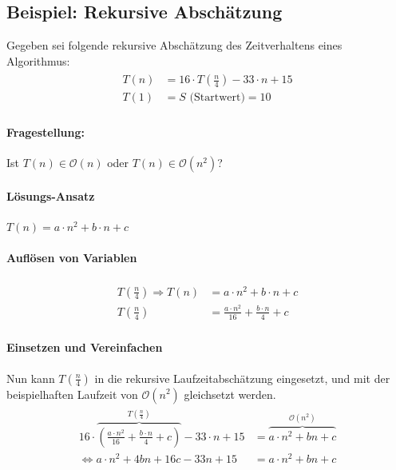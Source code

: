 \subsection{Beispiel: Rekursive Abschätzung}
Gegeben sei folgende rekursive Abschätzung des Zeitverhaltens eines Algorithmus:
\begin{align*}
\begin{split}
	T(n) &= 16 \cdot T(\frac{n}{4}) - 33 \cdot n + 15 \\
	T(1) &= S \text{ (Startwert)} = 10
\end{split}
\end{align*}
\paragraph{Fragestellung:} Ist $T(n) \in \mathcal{O}(n)$ oder $T(n) \in \mathcal{O}(n^2)$?

\paragraph{Lösungs-Ansatz} $T(n) = a\cdot n^2 + b\cdot n + c$

\paragraph{Auflösen von Variablen}
\begin{align}
\begin{split}
T(\frac{n}{4}) \Rightarrow T(n) &= a\cdot n^2 + b\cdot n + c \\
T(\frac{n}{4}) &= \frac{a\cdot n^2}{16} + \frac{b\cdot n}{4} + c
\end{split}
\end{align}

\paragraph{Einsetzen und Vereinfachen}
Nun kann $T(\frac{n}{4})$ in die rekursive Laufzeitabschätzung eingesetzt, und mit der beispielhaften Laufzeit von $\mathcal{O}(n^2)$ gleichsetzt werden.
\begin{align}
\begin{split}
	16 \cdot \overbrace{(\frac{a \cdot n^2}{16} + \frac{b \cdot n}{4} + c)}^{T(\frac{n}{4})} - 33 \cdot n + 15 &= \overbrace{a \cdot n^2 + bn + c}^{\mathcal{O}(n^2)} \\
	\Leftrightarrow a \cdot n^2 + 4bn + 16c - 33n + 15 &= a \cdot n^2 + bn + c
\end{split}
\end{align}

